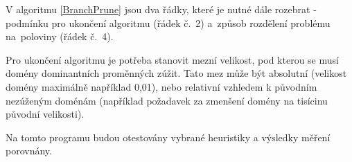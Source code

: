 V algoritmu \ref{BranchPrune} jsou dva řádky, které je nutné dále rozebrat - podmínku pro ukončení algoritmu (řádek č.~2) a~způsob rozdělení problému na~poloviny (řádek č.~4).

Pro ukončení algoritmu je potřeba stanovit mezní velikost, pod kterou se musí domény dominantních proměnných zúžit. Tato mez může být absolutní (velikost domény maximálně například 0,01), nebo relativní vzhledem k původním nezúženým doménám (například požadavek za zmenšení domény na tisícinu původní velikosti).

Na tomto programu budou otestovány vybrané heuristiky a výsledky měření porovnány.